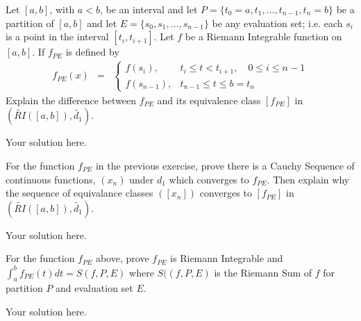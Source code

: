 \documentclass[11pt]{SelfArxOneColBMN}
\begin{document}
\begin{exercise}
Let $[a,b]$, with $a < b$, be an interval and let 
$P = \{t_0 = a, t_1, \ldots, t_{n-1}, t_n = b\}$
be a partition of $[a,b]$ and let
$E = \{s_0,s_1, \ldots, s_{n-1}\}$
be any evaluation set; i.e. each $s_i$ is a point in the
interval $[t_i, t_{i+1}]$.  Let $f$ be a Riemann Integrable function on
$[a,b]$.
If $f_{PE}$ is defined by
\begin{eqnarray*}
f_{PE}(x) &=&
\left \{
\begin{array}{ll}
f(s_i), & t_i \leq t < t_{i+1}, \quad 0 \leq i \leq n-1\\
f(s_{n-1}), &  t_{n-1} \leq t \leq b = t_n
\end{array}
\right .
\end{eqnarray*}
\noindent
\noindent
Explain the difference between $f_{PE}$ and its equivalence
class $[f_{PE}]$ in $(\widetilde{RI}([a,b]), \widetilde{d_1})$.
\end{exercise}

\begin{solution}
Your solution here.
\end{solution}
	
\begin{exercise}
For the function $f_{PE}$ in the previous exercise, 
prove there is a  Cauchy Sequence of continuous functions, $(x_n)$
under $d_1$ which converges to $f_{PE}$.  Then explain why the sequence of
equivalance classes $([x_n])$ converges to $[f_{PE}]$ in
$(\widetilde{RI}([a,b]), \widetilde{d_1})$.
\end{exercise}

\begin{solution}
Your solution here.
\end{solution}

\begin{exercise}
For the function $f_{PE}$ above, 
prove $f_{PE}$ is Riemann Integrable and $\int_a^b f_{PE}(t) dt = S(f,P,E)$
where $S((f,P,E)$ is the Riemann Sum of $f$ for partition $P$ and evaluation set $E$.
\end{exercise}

\begin{solution}
Your solution here.
\end{solution}
\end{document}
